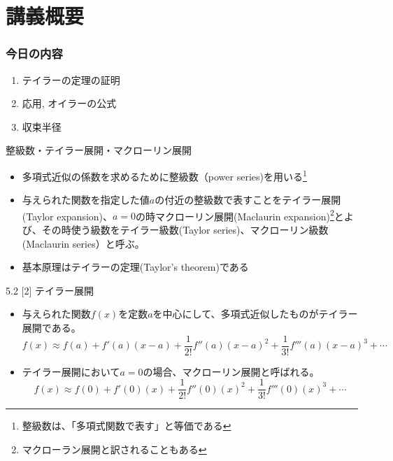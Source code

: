 
\section{講義概要}


\begin{frame}
\frametitle{今日の内容}
\begin{enumerate}
\item テイラーの定理の証明
\item 応用, オイラーの公式
\item 収束半径
\end{enumerate} 



\end{frame}


\begin{slide}{整級数・テイラー展開・マクローリン展開}
\begin{itemize}
\item 多項式近似の係数を求めるために整級数（power series)を用いる\footnote{整級数は、「多項式関数で表す」と等価である}
\item 与えられた関数を指定した値$a$の付近の整級数で表すことをテイラー展開(Taylor expansion)、$a=0$の時マクローリン展開(Maclaurin expansion)\footnote{マクローラン展開と訳されることもある}とよび、その時使う級数をテイラー級数(Taylor series)、マクローリン級数(Maclaurin series）と呼ぶ。
\item 基本原理はテイラーの定理(Taylor's theorem)である
\end{itemize}
\end{slide}
\begin{slide}{5.2 [2] テイラー展開}
\begin{itemize}
\item 与えられた関数$f(x)$を定数$a$を中心にして、多項式近似したものがテイラー展開である。
\begin{equation}
f(x) \approx f(a) + f'(a)(x-a) + \frac{1}{2!}f''(a)(x-a)^2 + \frac{1}{3!}f'''(a)(x-a)^3 + \cdots \label{eq:taylorseries}
\end{equation}
\item テイラー展開において$a=0$の場合、マクローリン展開と呼ばれる。
\begin{equation}
f(x) \approx f(0) + f'(0)(x) + \frac{1}{2!}f''(0)(x)^2 + \frac{1}{3!}f'''(0)(x)^3 + \cdots \label{eq:macseries}
\end{equation}
\end{itemize}
\end{slide}
